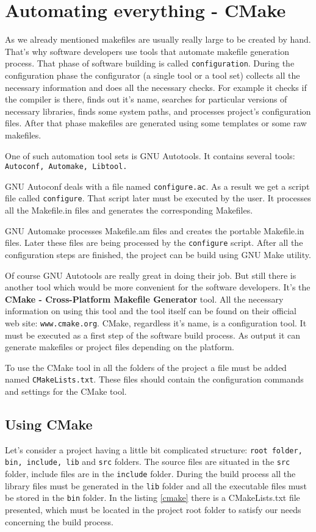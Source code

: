 
\section{Automating everything - CMake}
\label{autotools}

As we already mentioned makefiles are usually really large to be created by hand. That's why software developers use tools that automate makefile generation process. That phase of software building is called {\tt configuration}. During the configuration phase the configurator (a single tool or a tool set) collects all the necessary information and does all the necessary checks. For example it checks if the compiler is there, finds out it's name, searches for particular versions of necessary libraries, finds some system paths, and processes project's configuration files. After that phase makefiles are generated using some templates or some raw makefiles. 

One of such automation tool sets is GNU Autotools. It contains several tools: {\tt Autoconf, Automake, Libtool.} 

GNU Autoconf deals with a file named {\tt configure.ac}. As a result we get a script file called {\tt configure}. That script later must be executed by the user. It processes all the Makefile.in files and generates the corresponding Makefiles.

GNU Automake processes Makefile.am files and creates the portable Makefile.in files. Later these files are being processed by the {\tt configure} script. After all the configuration steps are finished, the project can be build using GNU Make utility.

Of course GNU Autotools are really great in doing their job. But still there is another tool which would be more convenient for the software developers. It's the {\bf CMake - Cross-Platform Makefile Generator} tool. All the necessary information on using this tool and the tool itself can be found on their official web site: {\tt www.cmake.org}. CMake, regardless it's name, is a configuration tool. It must be executed as a first step of the software build process. As output it can generate makefiles or project files depending on the platform. 

To use the CMake tool in all the folders of the project a file must be added named {\tt CMakeLists.txt}. These files should contain the configuration commands and settings for the CMake tool.

\subsection {Using CMake}
Let's consider a project having a little bit complicated structure: {\tt root folder, bin, include, lib} and {\tt src} folders. The source files are situated in the {\tt src} folder, include files are in the {\tt include} folder. During the build process all the library files must be generated in the {\tt lib} folder and all the executable files must be stored in the {\tt bin} folder. In the listing \ref {cmake} there is a CMakeLists.txt file presented, which must be located in the project root folder to satisfy our needs concerning the build process.



